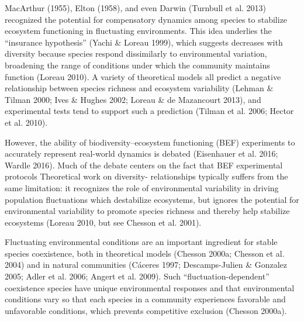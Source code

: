 \documentclass[12pt,]{article}
\begin{document}
MacArthur (1955), Elton (1958), and even Darwin (Turnbull et al. 2013)
recognized the potential for compensatory dynamics among species to
stabilize ecosystem functioning in fluctuating environments. This idea
underlies the ``insurance hypothesis'' (Yachi \& Loreau 1999), which
suggests
decreases with diversity because species respond dissimilarly to
environmental variation, broadening the range of conditions under which
the community maintains function (Loreau 2010). A variety of theoretical
models all predict a negative relationship between species richness and
ecosystem variability (Lehman \& Tilman 2000; Ives \& Hughes 2002;
Loreau \& de Mazancourt 2013), and experimental tests tend to support
such a prediction (Tilman et al. 2006; Hector et al. 2010).

However, the ability of biodiversity--ecosystem functioning (BEF)
experiments to accurately represent real-world dynamics is debated
(Eisenhauer et al. 2016; Wardle 2016). Much of the debate centers on the
fact that BEF experimental protocols
Theoretical work on diversity- relationships
typically suffers from the same limitation: it recognizes the role of
environmental variability in driving population fluctuations which
destabilize ecosystems, but ignores the potential for environmental
variability to promote species richness and thereby help stabilize
ecosystems (Loreau 2010, but see Chesson et al. 2001).

Fluctuating environmental conditions are an important ingredient for
stable species coexistence, both in theoretical models (Chesson 2000a;
Chesson et al. 2004) and in natural communities (Cáceres 1997;
Descamps-Julien \& Gonzalez 2005; Adler et al. 2006; Angert et al.
2009). Such ``fluctuation-dependent'' coexistence
 species have unique environmental
responses and that environmental conditions vary so that each species in
a community experiences favorable and unfavorable conditions, which
prevents competitive exclusion (Chesson 2000a).
\end{document}
